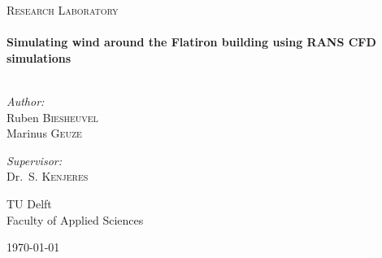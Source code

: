 \begin{titlepage}
\begin{center}



\textsc{\Large Research Laboratory}\\[0.5cm]

\HRule \\[0.4cm]
{ \huge \bfseries Simulating wind around the Flatiron building using RANS CFD simulations}\\[0.4cm]

\HRule \\[1.5cm]

\begin{minipage}{0.45\textwidth}
\begin{flushleft} \large
\emph{Author:}\\
Ruben \textsc{Biesheuvel}\\
Marinus \textsc{Geuze}
\end{flushleft}
\end{minipage}
\begin{minipage}{0.45\textwidth}
\begin{flushright} \large
\emph{Supervisor:} \\
Dr.~S. \textsc{Kenjeres}

\end{flushright}
\end{minipage}

\vfill

\begin{minipage}{0.45\textwidth}
\begin{flushleft}
{\large TU Delft}\\
{\normalsize Faculty of Applied Sciences}
\end{flushleft}
\end{minipage}
\begin{minipage}{0.45\textwidth}
\begin{flushright}
{\large \today}
\end{flushright}
\end{minipage}




\end{center}
\end{titlepage}
